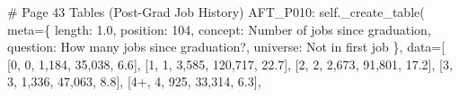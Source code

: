 \documentclass[
  11pt,
  a4paper,
]{article}
\newenvironment{Shaded}{\begin{snugshade}}{\end{snugshade}}
\newcommand{\CommentTok}[1]{\textcolor[rgb]{0.37,0.37,0.37}{#1}}
\newcommand{\NormalTok}[1]{\textcolor[rgb]{0.00,0.23,0.31}{#1}}
\newcommand{\OperatorTok}[1]{\textcolor[rgb]{0.37,0.37,0.37}{#1}}
\newcommand{\StringTok}[1]{\textcolor[rgb]{0.13,0.47,0.30}{#1}}
\newcommand{\VariableTok}[1]{\textcolor[rgb]{0.07,0.07,0.07}{#1}}
\begin{document}
\begin{Shaded}
\begin{Highlighting}[]
    \CommentTok{\# Page 43 Tables (Post{-}Grad Job History)}
    \StringTok{\textquotesingle{}AFT\_P010\textquotesingle{}}\NormalTok{: }\VariableTok{self}\NormalTok{.\_create\_table(}
\NormalTok{        meta}\OperatorTok{=}\NormalTok{\{}
            \StringTok{\textquotesingle{}length\textquotesingle{}}\NormalTok{: }\StringTok{\textquotesingle{}1.0\textquotesingle{}}\NormalTok{, }\StringTok{\textquotesingle{}position\textquotesingle{}}\NormalTok{: }\StringTok{\textquotesingle{}104\textquotesingle{}}\NormalTok{,}
            \StringTok{\textquotesingle{}concept\textquotesingle{}}\NormalTok{: }\StringTok{\textquotesingle{}Number of jobs since graduation\textquotesingle{}}\NormalTok{,}
            \StringTok{\textquotesingle{}question\textquotesingle{}}\NormalTok{: }\StringTok{\textquotesingle{}How many jobs since graduation?\textquotesingle{}}\NormalTok{,}
            \StringTok{\textquotesingle{}universe\textquotesingle{}}\NormalTok{: }\StringTok{\textquotesingle{}Not in first job\textquotesingle{}}
\NormalTok{        \},}
\NormalTok{        data}\OperatorTok{=}\NormalTok{[}
\NormalTok{            [}\StringTok{\textquotesingle{}0\textquotesingle{}}\NormalTok{, }\StringTok{\textquotesingle{}0\textquotesingle{}}\NormalTok{, }\StringTok{\textquotesingle{}1,184\textquotesingle{}}\NormalTok{, }\StringTok{\textquotesingle{}35,038\textquotesingle{}}\NormalTok{, }\StringTok{\textquotesingle{}6.6\textquotesingle{}}\NormalTok{],}
\NormalTok{            [}\StringTok{\textquotesingle{}1\textquotesingle{}}\NormalTok{, }\StringTok{\textquotesingle{}1\textquotesingle{}}\NormalTok{, }\StringTok{\textquotesingle{}3,585\textquotesingle{}}\NormalTok{, }\StringTok{\textquotesingle{}120,717\textquotesingle{}}\NormalTok{, }\StringTok{\textquotesingle{}22.7\textquotesingle{}}\NormalTok{],}
\NormalTok{            [}\StringTok{\textquotesingle{}2\textquotesingle{}}\NormalTok{, }\StringTok{\textquotesingle{}2\textquotesingle{}}\NormalTok{, }\StringTok{\textquotesingle{}2,673\textquotesingle{}}\NormalTok{, }\StringTok{\textquotesingle{}91,801\textquotesingle{}}\NormalTok{, }\StringTok{\textquotesingle{}17.2\textquotesingle{}}\NormalTok{],}
\NormalTok{            [}\StringTok{\textquotesingle{}3\textquotesingle{}}\NormalTok{, }\StringTok{\textquotesingle{}3\textquotesingle{}}\NormalTok{, }\StringTok{\textquotesingle{}1,336\textquotesingle{}}\NormalTok{, }\StringTok{\textquotesingle{}47,063\textquotesingle{}}\NormalTok{, }\StringTok{\textquotesingle{}8.8\textquotesingle{}}\NormalTok{],}
\NormalTok{            [}\StringTok{\textquotesingle{}4+\textquotesingle{}}\NormalTok{, }\StringTok{\textquotesingle{}4\textquotesingle{}}\NormalTok{, }\StringTok{\textquotesingle{}925\textquotesingle{}}\NormalTok{, }\StringTok{\textquotesingle{}33,314\textquotesingle{}}\NormalTok{, }\StringTok{\textquotesingle{}6.3\textquotesingle{}}\NormalTok{],}

\end{Highlighting}
\end{Shaded}
\end{document}
